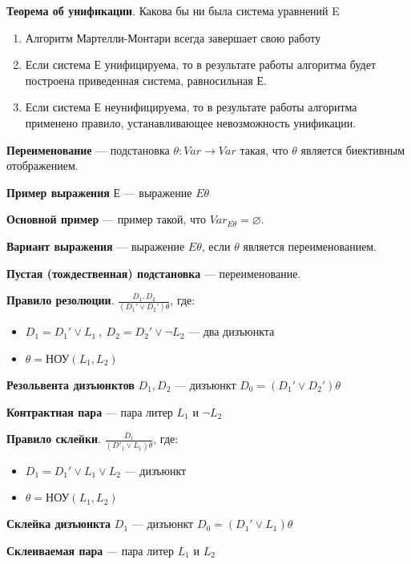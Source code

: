 \documentclass[a4paper,12pt]{article}
\begin{document}
\textbf{Теорема об унификации}. Какова бы ни была система уравнений E
\begin{enumerate}
 \item Алгоритм Мартелли-Монтари всегда завершает свою работу
 \item Если система Е унифицируема, то в результате работы алгоритма будет построена приведенная система, равносильная Е.
 \item Если система Е неунифицируема, то в результате работы алгоритма применено правило, устанавливающее невозможность унификации.
\end{enumerate}


\textbf{Переименование} --- подстановка $\theta : Var \rightarrow Var$ такая, что $\theta$ является биективным отображением.

\textbf{Пример выражения} Е --- выражение $E\theta$

\textbf{Основной пример} --- пример такой, что $Var_{E\theta} = \varnothing$.

\textbf{Вариант выражения} --- выражение $E\theta$, если $\theta$ является переименованием.

\textbf{Пустая (тождественная) подстановка} --- переименование.

\textbf{Правило резолюции}. $\frac{D_1, D_2}{(D_1' \vee D_2')\theta}$, где:
\begin{itemize}
 \item $D_1 = D_1' \vee L_1~,~D_2 = D_2' \vee \neg L_2$ --- два дизъюнкта
 \item $\theta = \text{НОУ}(L_1,L_2)$
\end{itemize}

\textbf{Резольвента дизъюнктов} $D_1,D_2$ --- дизъюнкт $D_0 = (D_1' \vee D_2')\theta$

\textbf{Контрактная пара} --- пара литер $L_1$ и $\neg L_2$

\textbf{Правило склейки}. $\frac{D_1}{(D'_1 \vee L_1)\theta}$, где:
\begin{itemize}
 \item $D_1 = D_1' \vee L_1 \vee L_2$ --- дизъюнкт
 \item $\theta = \text{НОУ}(L_1,L_2)$
\end{itemize}

\textbf{Склейка дизъюнкта} $D_1$ --- дизъюнкт $D_0 = (D_1' \vee L_1)\theta$

\textbf{Склеиваемая пара} --- пара литер $L_1$ и $L_2$
\end{document}
